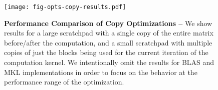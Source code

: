 
\begin{figure}[b]

  \centering
  \texttt{[image: fig-opts-copy-results.pdf]}

  \caption{\textbf{Performance Comparison of Copy Optimizations --}
    We show results for a large scratchpad with a single copy of the
    entire matrix before/after the computation, and a small scratchpad
    with multiple copies of just the blocks being used for the current
    iteration of the computation kernel. We intentionally omit the
    results for BLAS and MKL implementations in order to focus on the
    behavior at the performance range of the optimization.}

  \label{fig-opts-copy-results}

\end{figure}
